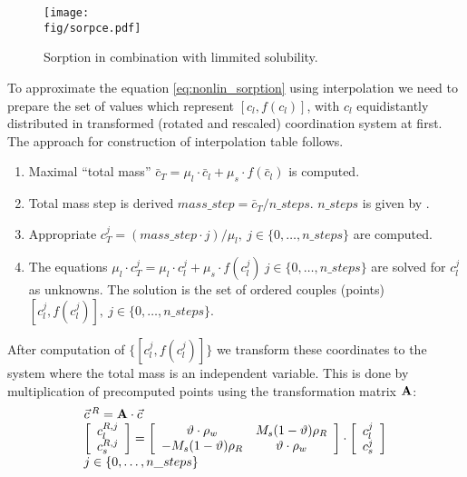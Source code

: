 \begin{figure}[ht!]
 \centering
 \texttt{[image: \\fig/sorpce.pdf]}
 \caption{Sorption in combination with limmited solubility.}
 \label{fig:sorpce}
\end{figure}


To approximate the equation \eqref{eq:nonlin_sorption} using interpolation we need to prepare the set of values 
which represent $[c_l, f(c_l)]$, with $c_l$ equidistantly distributed in transformed (rotated and rescaled) 
coordination system at first. The approach for construction of interpolation table follows.
\begin{enumerate}
 \item Maximal ``total mass'' $\bar{c}_T = \mu_l\cdot \bar{c}_l + \mu_s\cdot f(\bar{c}_l)$ is computed.
 \item Total mass step is derived $mass\_step = \bar{c}_T/n\_steps$. $n\_steps$ is given by
       .
 \item Appropriate $c_T^j = (mass\_step\cdot j)/\mu_l,~j\in \{0,\ldots, n\_steps\}$ are computed. 
 \item The equations $\mu_l \cdot c_T^j = \mu_l\cdot c_l^j + \mu_s\cdot f(c_l^j)~j\in \{0,\ldots, n\_steps\}$ are solved 
       for $c_l^j$ as unknowns. The solution is the set of ordered couples (points) 
       $[c_l^j,f(c_l^j)],~j\in\{0,\ldots,n\_steps\}$.
\end{enumerate}
After computation of $\{[c_l^j,f(c_l^j)]\}$ we transform these coordinates to the system where the total mass is 
an independent variable. This is done by multiplication of precomputed points using the transformation matrix ${\bf A}$:
\begin{equation}
 \begin{array}{l}
  \vec{c}\,^R = {\bf A}\cdot\vec{c}\\
  \left[\begin{array}{c} c_l^{R,j}\\ c_s^{R,j} \end{array}\right] = 
  \left[\begin{array}{cc}
    \vartheta\cdot \rho_w & M_s(1 - \vartheta)\rho_R\\
    -M_s(1 - \vartheta)\rho_R & \vartheta\cdot \rho_w
  \end{array}\right]\cdot
  \left[\begin{array}{c} c_l^j\\ c_s^j \end{array}\right]\\
  j\in\{0,\ldots,n\_steps\}
 \end{array}
 \label{eq:transf_mat}
\end{equation}

